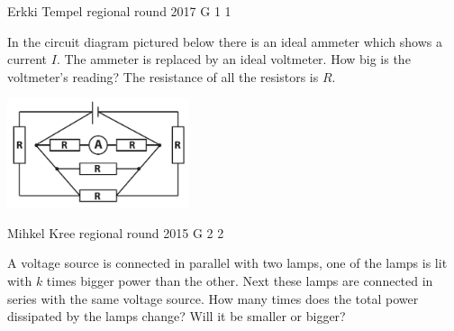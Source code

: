 \documentclass[11pt]{article}
\begin{document}
{Erkki Tempel} %
{regional round} %
{2017} %
{G 1} %
{1} %
{

\ifEngStatement
In the circuit diagram pictured below there is an ideal ammeter which shows a current $I$. The ammeter is replaced by an ideal voltmeter. How big is the voltmeter’s reading? The resistance of all the resistors is $R$.
\begin{center}
	\includegraphics[width=0.4\textwidth]{2017-v2g-01-skeem}
\end{center}
\fi
}

{Mihkel Kree} %
{regional round} %
{2015} %
{G 2} %
{2} %
{

\ifEngStatement
A voltage source is connected in parallel with two lamps, one of the lamps is lit with $k$ times bigger power than the other. Next these lamps are connected in series with the same voltage source. How many times does the total power dissipated by the lamps change? Will it be smaller or bigger?
\fi
}
\end{document}
